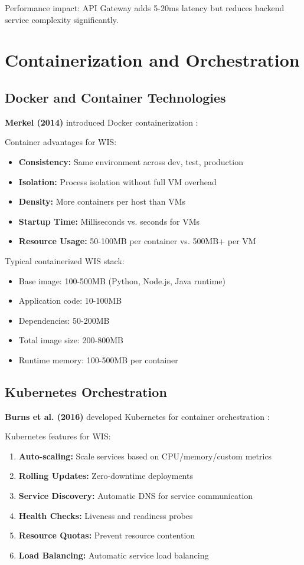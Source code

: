 \documentclass[conference]{IEEEtran}
\begin{document}
\begin{enumerate}
Performance impact: API Gateway adds 5-20ms latency but reduces backend service complexity significantly.

\section{Containerization and Orchestration}

\subsection{Docker and Container Technologies}

\textbf{Merkel (2014)} introduced Docker containerization \cite{merkel2014docker}:

Container advantages for WIS:
\begin{itemize}
    \item \textbf{Consistency:} Same environment across dev, test, production
    \item \textbf{Isolation:} Process isolation without full VM overhead
    \item \textbf{Density:} More containers per host than VMs
    \item \textbf{Startup Time:} Milliseconds vs. seconds for VMs
    \item \textbf{Resource Usage:} 50-100MB per container vs. 500MB+ per VM
\end{itemize}

Typical containerized WIS stack:
\begin{itemize}
    \item Base image: 100-500MB (Python, Node.js, Java runtime)
    \item Application code: 10-100MB
    \item Dependencies: 50-200MB
    \item Total image size: 200-800MB
    \item Runtime memory: 100-500MB per container
\end{itemize}

\subsection{Kubernetes Orchestration}

\textbf{Burns et al. (2016)} developed Kubernetes for container orchestration \cite{burns2016borg}:

Kubernetes features for WIS:
\begin{enumerate}
    \item \textbf{Auto-scaling:} Scale services based on CPU/memory/custom metrics
    \item \textbf{Rolling Updates:} Zero-downtime deployments
    \item \textbf{Service Discovery:} Automatic DNS for service communication
    \item \textbf{Health Checks:} Liveness and readiness probes
    \item \textbf{Resource Quotas:} Prevent resource contention
    \item \textbf{Load Balancing:} Automatic service load balancing
\end{enumerate}


\end{enumerate}
\end{document}

